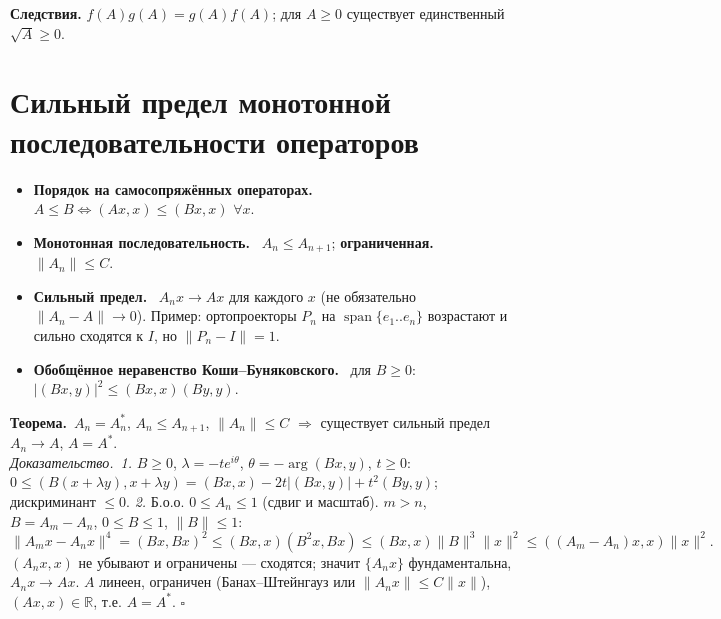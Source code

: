 \documentclass[11pt,a4paper]{article}
\newcommand{\RR}{\mathbb R}
\newcommand{\df}[1]{\textbf{#1.}~}
\newcommand{\thm}{\textbf{Теорема.}~}
\newcommand{\pf}{\textit{Доказательство.}~}
\newcommand{\qedd}{\hfill$\square$}
\begin{document}
\textbf{Следствия.} $f(A)g(A)=g(A)f(A)$; для $A\ge0$ существует единственный $\sqrt A\ge0$.

\section{Сильный предел монотонной последовательности операторов}
\begin{defs}
\begin{itemize}
\item \df{Порядок на самосопряжённых операторах} $A\le B\iff(Ax,x)\le(Bx,x)$ $\forall x$.
\item \df{Монотонная последовательность} $A_n\le A_{n+1}$; \df{ограниченная} $\|A_n\|\le C$.
\item \df{Сильный предел} $A_nx\to Ax$ для каждого $x$ (не обязательно $\|A_n-A\|\to0$). Пример: ортопроекторы $P_n$ на $\operatorname{span}\{e_1..e_n\}$ возрастают и сильно сходятся к $I$, но $\|P_n-I\|=1$.
\item \df{Обобщённое неравенство Коши–Буняковского} для $B\ge0$: $|(Bx,y)|^2\le(Bx,x)(By,y)$.
\end{itemize}
\end{defs}

\thm $A_n=A_n^*$, $A_n\le A_{n+1}$, $\|A_n\|\le C$ $\Rightarrow$ существует сильный предел $A_n\to A$, $A=A^*$.\\
\pf \textit{1.} $B\ge0$, $\lambda=-te^{i\theta}$, $\theta=-\arg(Bx,y)$, $t\ge0$: $0\le(B(x+\lambda y),x+\lambda y)=(Bx,x)-2t|(Bx,y)|+t^2(By,y)$; дискриминант $\le0$.
\textit{2.} Б.о.о. $0\le A_n\le1$ (сдвиг и масштаб). $m>n$, $B=A_m-A_n$, $0\le B\le1$, $\|B\|\le1$:
\[\|A_mx-A_nx\|^4=(Bx,Bx)^2\le(Bx,x)(B^2x,Bx)\le(Bx,x)\|B\|^3\|x\|^2\le((A_m-A_n)x,x)\|x\|^2.\]
$(A_nx,x)$ не убывают и ограничены — сходятся; значит $\{A_nx\}$ фундаментальна, $A_nx\to Ax$. $A$ линеен, ограничен (Банах–Штейнгауз или $\|A_nx\|\le C\|x\|$), $(Ax,x)\in\RR$, т.е. $A=A^*$. \qedd
\end{document}

